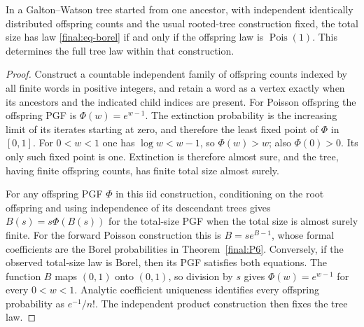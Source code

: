 \begin{theorem}
\label{final:P6-gw}
In a Galton--Watson tree started from one ancestor, with independent
identically distributed offspring counts and the usual rooted-tree
construction fixed, the total size has law \eqref{final:eq-borel}
if and only if the offspring law is $\operatorname{Pois}(1)$.
This determines the full tree law within that construction.
\end{theorem}
\begin{proof}
Construct a countable independent family of offspring counts indexed
by all finite words in positive integers, and retain a word as a
vertex exactly when its ancestors and the indicated child indices
are present.  For Poisson offspring the offspring PGF is
$\Phi(w)=e^{w-1}$.  The extinction probability is the increasing
limit of its iterates starting at zero, and therefore the least
fixed point of $\Phi$ in $[0,1]$.  For $0<w<1$ one has
$\log w<w-1$, so $\Phi(w)>w$; also $\Phi(0)>0$.
Its only such fixed point is one.  Extinction is therefore almost
sure, and the tree, having finite offspring counts, has finite
total size almost surely.

For any offspring PGF $\Phi$ in this iid construction, conditioning
on the root offspring and using independence of its descendant
trees gives $B(s)=s\Phi(B(s))$ for the total-size PGF when the total
size is almost surely finite.  For the forward Poisson construction
this is $B=se^{B-1}$, whose formal coefficients are the Borel
probabilities in Theorem~\ref{final:P6}.  Conversely, if the observed
total-size law is Borel, then its PGF satisfies both equations.
The function $B$ maps $(0,1)$ onto $(0,1)$, so division by $s$ gives
$\Phi(w)=e^{w-1}$ for every $0<w<1$.  Analytic coefficient uniqueness
identifies every offspring probability as $e^{-1}/n!$.
The independent product construction then fixes the tree law.
\end{proof}

